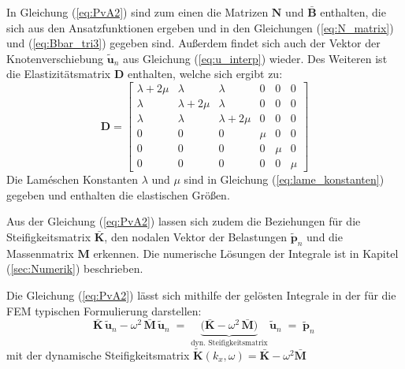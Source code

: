 In Gleichung (\ref{eq:PvA2}) sind zum einen die Matrizen $\mathbf{N}$ und $\bar{\mathbf B}$ enthalten, die sich aus den Ansatzfunktionen ergeben und in den Gleichungen (\ref{eq:N_matrix}) und (\ref{eq:Bbar_tri3}) gegeben sind. 
Außerdem findet sich auch der Vektor der Knotenverschiebung $\tilde{\mathbf u}_{n}$ aus Gleichung (\ref{eq:u_interp}) wieder.
Des Weiteren ist die Elastizitätsmatrix $\mathbf{D}$ enthalten, welche sich ergibt zu:
\begin{equation}\label{eq:Elastizitätsmatrix}
	\mathbf D =
	\begin{bmatrix}
		\lambda+2\mu & \lambda      & \lambda      & 0 & 0 & 0 \\
		\lambda      & \lambda+2\mu & \lambda      & 0 & 0 & 0 \\
		\lambda      & \lambda      & \lambda+2\mu & 0 & 0 & 0 \\
		0            & 0            & 0            & \mu & 0   & 0 \\
		0            & 0            & 0            & 0   & \mu & 0 \\
		0            & 0            & 0            & 0   & 0   & \mu
	\end{bmatrix}
\end{equation}
Die Laméschen Konstanten $\lambda$ und $\mu$ sind in Gleichung (\ref{eq:lame_konstanten}) gegeben und enthalten die elastischen Größen.


Aus der Gleichung (\ref{eq:PvA2}) lassen sich zudem die Beziehungen für die Steifigkeitsmatrix \(\bar{\mathbf{K}}\), den nodalen Vektor der Belastungen $\tilde{\mathbf p}_{n}$ und die Massenmatrix \(\mathbf{M}\) erkennen. 
Die numerische Lösungen der Integrale ist in Kapitel (\ref{sec:Numerik}) beschrieben.

Die Gleichung (\ref{eq:PvA2}) lässt sich mithilfe der gelösten Integrale in der für die FEM typischen Formulierung darstellen:
\begin{equation}\label{eq:PvA_FEM}
	\bar{\mathbf K}\,\tilde{\mathbf u}_{n}
	- \omega^{2}\,\bar{\mathbf M}\,\tilde{\mathbf u}_{n}
	\;=\;
	\underbrace{\bigl(\bar{\mathbf K}-\omega^{2}\,\bar{\mathbf M}\bigr)}_{\text{dyn.\ Steifigkeitsmatrix}}\,
	\tilde{\mathbf u}_{n}
	\;=\; \tilde{\mathbf p}_{n}\,
\end{equation}
mit der dynamische Steifigkeitsmatrix $\tilde{\mathbf K}(k_x,\omega)=\bar{\mathbf K}-\omega^{2}\bar{\mathbf M}$


